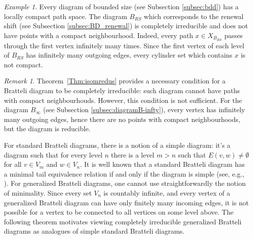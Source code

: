 \documentclass[11pt, twoside]{amsart}
\theoremstyle{definition}
\theoremstyle{remark}
\newtheorem{example}[definition]{Example}
\newtheorem{remark}[definition]{Remark}
\theoremstyle{plain}
\newcommand{\N}{\mathbb N}
\numberwithin{equation}{section}
\begin{document}
\begin{example}
    Every diagram of bounded size (see Subsection \ref{subsec:bdd}) has a locally compact path space. The diagram $B_{RS}$ which corresponds to the renewal shift (see Subsection \ref{subsec:BD_renewal}) is completely irreducible and does not have points with a compact neighbourhood.
    Indeed, every path $x \in X_{B_{RS}}$ passes through the first vertex infinitely many times. Since the first vertex of each level of $B_{RS}$ has infinitely many outgoing edges, every cylinder set which contains $x$ is not compact.
    
    \end{example}

\begin{remark}
Theorem~\ref{Thm:isomredus} provides a 
necessary condition for a Bratteli diagram to be completely irreducible: such diagram cannot have paths with compact neighbourhouds. However, this condition is not sufficient. For the diagram $B_{\infty}$ (see Subsection \ref{subsec:diagramB-infty}), every vertex has infinitely many outgoing edges, hence there are no points with compact neighbourhoods, but the diagram is reducible. 
\end{remark}


For standard Bratteli diagrams, there is a notion of a simple diagram: it's a diagram such that for every level $n$ there is a level $m > n$ such that $E(v,w) \neq \emptyset$ for all $v \in V_m$ and $w \in V_n$. %
It is well known that a standard Bratteli diagram has a minimal tail equivalence relation if and only if the diagram is simple 
(see, e.g., \cite[Theorem 2.5]{Putnam2010}). For generalized Bratteli diagrams, one cannot use straightforwardly the notion of minimality. Since every set $V_n$ is countably infinite, and every vertex of a generalized Bratteli diagram can have only finitely many incoming edges, it is not possible for a vertex to be connected to all vertices on some level above. The following theorem motivates viewing completely irreducible generalized Bratteli diagrams as analogues of simple standard Bratteli diagrams.
\end{document}
